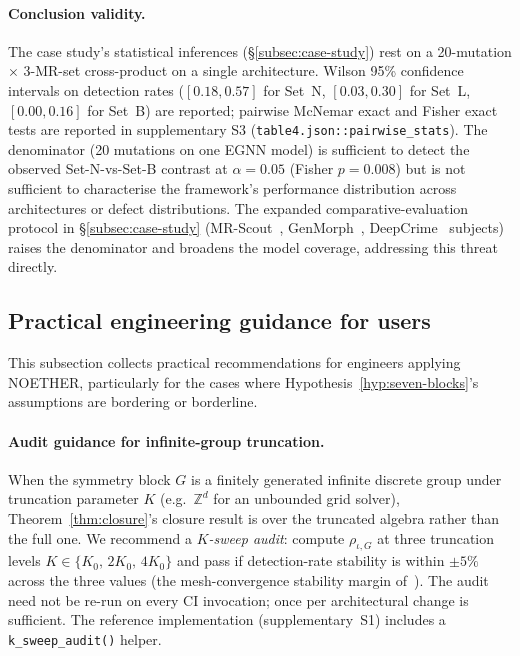 \documentclass[acmsmall, screen]{acmart}
\begin{document}
\paragraph{Conclusion validity.} The case study's statistical inferences (\S\ref{subsec:case-study}) rest on a 20-mutation $\times$ 3-MR-set cross-product on a single architecture. Wilson 95\% confidence intervals on detection rates ($[0.18,0.57]$ for Set~N, $[0.03,0.30]$ for Set~L, $[0.00,0.16]$ for Set~B) are reported; pairwise McNemar exact and Fisher exact tests are reported in supplementary S3 (\texttt{table4.json::pairwise\_stats}). The denominator (20 mutations on one EGNN model) is sufficient to detect the observed Set-N-vs-Set-B contrast at $\alpha = 0.05$ (Fisher $p = 0.008$) but is not sufficient to characterise the framework's performance distribution across architectures or defect distributions. The expanded comparative-evaluation protocol in \S\ref{subsec:case-study} (MR-Scout~\cite{MRScout2024}, GenMorph~\cite{GenMorph2024}, DeepCrime~\cite{Humbatova2021DeepCrime} subjects) raises the denominator and broadens the model coverage, addressing this threat directly.

\subsection{Practical engineering guidance for users}
\label{subsec:engineering-guidance}

This subsection collects practical recommendations for engineers applying NOETHER, particularly for the cases where Hypothesis~\ref{hyp:seven-blocks}'s assumptions are bordering or borderline.

\paragraph{Audit guidance for infinite-group truncation.} When the symmetry block $G$ is a finitely generated infinite discrete group under truncation parameter $K$ (e.g.\ $\mathbb{Z}^{d}$ for an unbounded grid solver), Theorem~\ref{thm:closure}'s closure result is over the truncated algebra rather than the full one. We recommend a \emph{$K$-sweep audit}: compute $\rho_{\iota,G}$ at three truncation levels $K \in \{K_0,\, 2K_0,\, 4K_0\}$ and pass if detection-rate stability is within $\pm 5\%$ across the three values (the mesh-convergence stability margin of~\cite[\S6.2]{LewisMiller1993}). The audit need not be re-run on every CI invocation; once per architectural change is sufficient. The reference implementation (supplementary~S1) includes a \texttt{k\_sweep\_audit()} helper.
\end{document}
